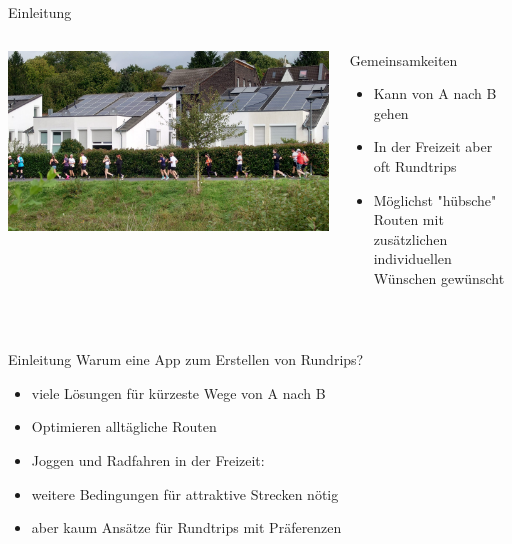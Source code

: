 \documentclass[aspectratio=169,xcolor=dvipsnames, t]{beamer}
\begin{document}
\begin{frame}{Einleitung}
\begin{columns}
\begin{column}{0.48\textwidth}
\begin{flushleft}
					\includegraphics[height=0.3\textheight]{images/WhatsApp Bild 2023-11-24 um 14.35.53_5752c78a.jpg}
				\end{flushleft}
		\end{column}
		\pause
		\begin{column}{0.48\textwidth}
			\vspace{-2cm}
			\begin{block}{Gemeinsamkeiten}
				\begin{itemize}[<+->]
					\item Kann von A nach B gehen
					\item In der Freizeit aber oft Rundtrips
					\item Möglichst "hübsche" Routen mit zusätzlichen individuellen Wünschen gewünscht
				\end{itemize}
			\end{block}
		\end{column}
		\end{columns} ~\\
		
	\end{frame}
	
	\begin{frame}{Einleitung}
	\vspace{0.25cm}
	Warum eine App zum Erstellen von Rundrips?
	\pause
	\begin{itemize}[<+->]	
		\item viele Lösungen für kürzeste Wege von A nach B
		\item Optimieren alltägliche Routen
		\item Joggen und Radfahren in der Freizeit:
		\item weitere Bedingungen für attraktive Strecken nötig
		\item aber kaum Ansätze für Rundtrips mit Präferenzen
	\end{itemize}
	\end{frame}
\end{document}
